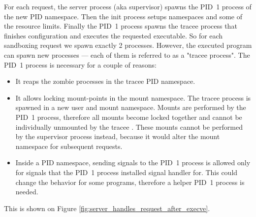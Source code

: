 \documentclass[en]{pracamgr}
\begin{document}
For each request, the server process (aka supervisor) spawns the PID~1 process of the new PID namespace. Then the init process setups namespaces and some of the resource limits. Finally the PID~1 process spawns the tracee process that finishes configuration and executes the requested executable. So for each sandboxing request we spawn exactly 2 processes. However, the executed program can spawn new processes --- each of them is referred to as a "tracee process". The PID~1 process is necessary for a couple of reasons:
\begin{itemize}
    \item It reaps the zombie processes in the tracee PID namespace.
    \item It allows locking mount-points in the mount namespace. The tracee process is spawned in a new user and mount namespace. Mounts are performed by the PID~1 process, therefore all mounts become locked together and cannot be individually unmounted by the tracee \cite{man_mount_namespaces}. These mounts cannot be performed by the supervisor process instead, because it would alter the mount namespace for subsequent requests.
    \item Inside a PID namespace, sending signals to the PID~1 process is allowed only for signals that the PID~1 process installed signal handler for. This could change the behavior for some programs, therefore a helper PID~1 process is needed.
\end{itemize}

This is shown on Figure \ref{fig:server_handles_request_after_execve}.
\end{document}
